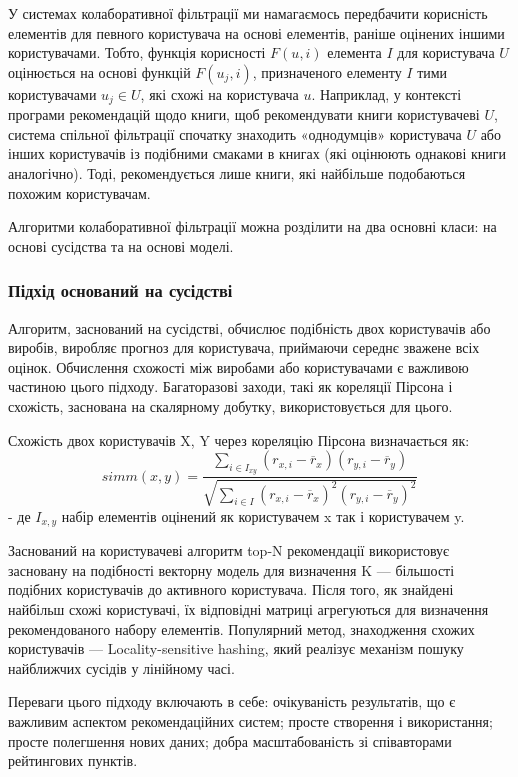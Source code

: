 У системах колаборативної фільтрації ми намагаємось передбачити корисність елементів для певного користувача на основі елементів, раніше оцінених іншими користувачами. Тобто, функція корисності $F(u, i)$ елемента $I$ для користувача $U$ оцінюється на основі функцій $F(u_{j}
    , i)$, призначеного елементу $I$ тими користувачами $u_{j} \in U$, які схожі на користувача $u$. Наприклад, у контексті програми рекомендацій щодо книги, щоб рекомендувати книги користувачеві $U$, система спільної фільтрації спочатку знаходить «однодумців» користувача $U$ або інших користувачів із подібними смаками в книгах (які оцінюють однакові книги аналогічно). Тоді, рекомендується лише книги, які найбільше подобаються похожим користувачам.

Алгоритми колаборативної фільтрації можна розділити на два основні класи: на основі сусідства та на основі моделі.

\subsubsection{Підхід оснований на сусідстві}
Алгоритм, заснований на сусідстві, обчислює подібність двох користувачів або виробів, виробляє прогноз для користувача, приймаючи середнє зважене всіх оцінок. Обчислення схожості між виробами або користувачами є важливою частиною цього підходу. Багаторазові заходи, такі як кореляції Пірсона і схожість, заснована на скалярному добутку, використовується для цього.

Схожість двох користувачів X, Y через кореляцію Пірсона визначається як:
\[simm(x,y) = \frac{{}\sum_{i \in I_{xy}}(r_{x,i} - \overline{r}_{x})(r_{y,i} - \overline{r}_{y})}
    {\sqrt{\sum_{i \in I} (r_{x,i} - \overline{r}_{x})^2(r_{y,i} - \overline{r}_{y})^2}}\] - де  $I_{x,y}$ набір елементів оцінений як користувачем x так і користувачем y.

Заснований на користувачеві алгоритм top-N рекомендації використовує засновану на подібності векторну модель для визначення K — більшості подібних користувачів до активного користувача. Після того, як знайдені найбільш схожі користувачі, їх відповідні матриці агрегуються для визначення рекомендованого набору елементів. Популярний метод, знаходження схожих користувачів — Locality-sensitive hashing, який реалізує механізм пошуку найближчих сусідів у лінійному часі.

Переваги цього підходу включають в себе: очікуваність результатів, що є важливим аспектом рекомендаційних систем; просте створення і використання; просте полегшення нових даних; добра масштабованість зі співавторами рейтингових пунктів.

